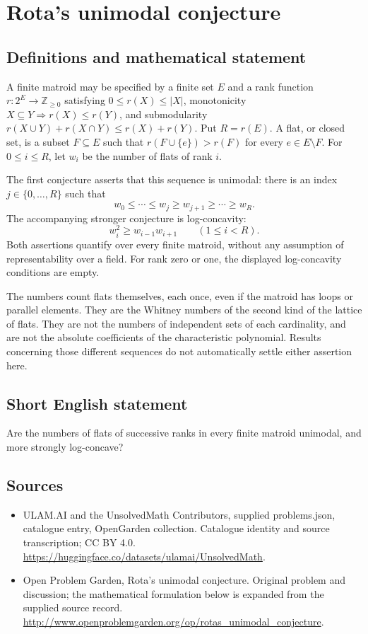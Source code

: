 \documentclass[11pt,a4paper]{article}
\begin{document}
\section*{Rota's unimodal conjecture}\label{statement}

\subsection{Definitions and mathematical statement}
A finite matroid may be specified by a finite set $E$ and a rank function
$r:2^E\to\mathbb Z_{\ge0}$ satisfying $0\le r(X)\le|X|$,
monotonicity $X\subseteq Y\Rightarrow r(X)\le r(Y)$, and submodularity
$r(X\cup Y)+r(X\cap Y)\le r(X)+r(Y)$. Put $R=r(E)$.
A flat, or closed set, is a subset $F\subseteq E$ such that
$r(F\cup\{e\})>r(F)$ for every $e\in E\setminus F$.
For $0\le i\le R$, let $w_i$ be the number of flats of rank $i$.

The first conjecture asserts that this sequence is unimodal: there is
an index $j\in\{0,\ldots,R\}$ such that
\[
 w_0\le\cdots\le w_j\ge w_{j+1}\ge\cdots\ge w_R.
\]
The accompanying stronger conjecture is log-concavity:
\[
 w_i^2\ge w_{i-1}w_{i+1}\qquad(1\le i<R).
\]
Both assertions quantify over every finite matroid, without any assumption
of representability over a field. For rank zero or one, the displayed
log-concavity conditions are empty.

The numbers count flats themselves, each once, even if the matroid has
loops or parallel elements. They are the Whitney numbers of the second
kind of the lattice of flats. They are not the numbers of independent
sets of each cardinality, and are not the absolute coefficients of the
characteristic polynomial. Results concerning those different sequences
do not automatically settle either assertion here.
\subsection{Short English statement}
Are the numbers of flats of successive ranks in every finite matroid unimodal, and more strongly log-concave?
\subsection{Sources}
\begin{itemize}
\item[S1] ULAM.AI and the UnsolvedMath Contributors, supplied problems.json, catalogue entry, OpenGarden collection. Catalogue identity and source transcription; CC BY 4.0.
\url{https://huggingface.co/datasets/ulamai/UnsolvedMath}.
\item[S2] Open Problem Garden, Rota's unimodal conjecture. Original problem and discussion; the mathematical formulation below is expanded from the supplied source record.
\url{http://www.openproblemgarden.org/op/rotas_unimodal_conjecture}.
\end{itemize}
\end{document}
